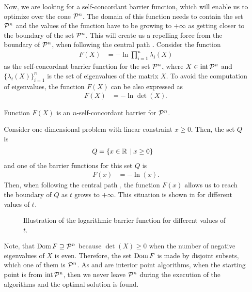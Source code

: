 Now, we are looking for a self-concordant barrier function, which will enable us to optimize over the cone $\mathcal{P}^n$.
The domain of this function needs to contain the set $\mathcal{P}^n$ and the values of the function have to be growing to $+\infty$ as getting closer to the boundary of the set $\mathcal{P}^n$.
This will create us a repelling force from the boundary of $\mathcal{P}^n$, when following the central path .
Consider the function 
\begin{align}
  F(X) &= -\ln\prod_{i=1}^{n}\lambda_i(X)
\end{align}
as the self-concordant barrier function for the set $\mathcal{P}^n$, where $X\in\operatorname{int}\mathcal{P}^n$ and $\big\{\lambda_i(X)\big\}_{i=1}^n$ is the set of eigenvalues of the matrix $X$.
To avoid the computation of eigenvalues, the function $F(X)$ can be also expressed as
\begin{align}
  F(X) &= -\ln\det(X).
\end{align}

\begin{theorem}
  Function $F(X)$ is an $n$-self-concordant barrier for $\mathcal{P}^n$.
\end{theorem}

\begin{example}
  Consider one-dimensional problem with linear constraint $x \geq 0$.
  Then, the set $Q$ is
  \begin{align}
    Q &= \{x\in\mathbb{R}\ |\ x \geq 0\}
  \end{align}
  and one of the barrier functions for this set $Q$ is
  \begin{align}
    F(x) &= -\ln(x).
  \end{align}
  Then, when following the central path , the function $F(x)$ allows us to reach the boundary of $Q$ as $t$ grows to $+\infty$.
  This situation is shown in  for different values of $t$.

  \begin{figure}[ht]
    \centering
    \resizebox{0.95\textwidth}{!}{}
    \caption{Illustration of the logarithmic barrier function for different values of $t$.}
  \end{figure}
\end{example}

Note, that $\operatorname{Dom} F \supseteq \mathcal{P}^n$ because $\det(X) \geq 0$ when the number of negative eigenvalues of $X$ is even. Therefore, the set $\operatorname{Dom} F$ is made by disjoint subsets, which one of them is $\mathcal{P}^n$. As  and  are interior point algorithms, when the starting point is from $\operatorname{int}\mathcal{P}^n$, then we never leave $\mathcal{P}^n$ during the execution of the algorithms and the optimal solution is found.

